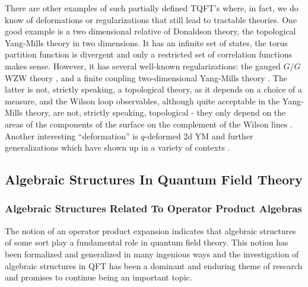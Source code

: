 \documentclass[12pt]{article}
\begin{document}
There are other examples of such partially defined TQFT's where, 
in fact, we do know of deformations or regularizations that still lead to tractable theories. One good example is a two dimensional relative of Donaldson theory, the topological Yang-Mills theory in two dimensions. It has an infinite set of states, the torus partition function is divergent and only a restricted set of correlation functions makes sense. However, it has 
several well-known regularizations: the gauged $G/G$ WZW theory \cite{Blau:1993tv,Gerasimov:1993ws, Witten:1993xi}, and a finite coupling two-dimensional Yang-Mills theory \cite{Moore-ICM,Witten:1992xu}. The latter is not, strictly speaking, a topological theory, as it depends on a choice of a measure, and the Wilson loop observables, although quite acceptable in the Yang-Mills theory, are not, strictly speaking, topological - they only depend on the areas of the components of the surface on the complement of the 
Wilson lines \cite{Cordes:1994sd,Gross:1993hu}. Another interesting ``deformation'' is $q$-deformed 2d YM and further generalizations which have shown up in a variety of contexts 
\cite{NikThesis,Aganagic:2004js,Gadde:2011ik,Rastelli:2014jja,Tachikawa:2015iba}.  


\subsection{Algebraic Structures In Quantum Field Theory}



\subsubsection{Algebraic Structures Related To Operator Product Algebras}

The notion of an operator product expansion indicates that
algebraic structures of some sort play a fundamental role in
quantum field theory. This notion has been formalized and
generalized in many ingenious ways and the investigation of
algebraic structures in QFT has been a dominant and enduring theme of
research   and promises to continue
being an important topic.
\end{document}
